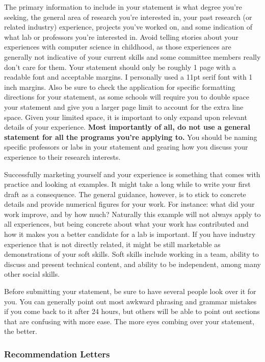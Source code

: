 \documentclass[12pt]{article}
\begin{document}
The primary information to include in your statement is what degree you're seeking, the general area of research you're interested in, your past research (or related industry) experience, projects you've worked on, and some indication of what lab or professors you're interested in. Avoid telling stories about your experiences with computer science in childhood, as those experiences are generally not indicative of your current skills and some committee members really don't care for them. \cite{mightgradguide,vasansop} Your statement should only be roughly 1 page with a readable font and acceptable margins. I personally used a 11pt serif font with 1 inch margins. Also be sure to check the application for specific formatting directions for your statement, as some schools will require you to double space your statement and give you a larger page limit to account for the extra line space. Given your limited space, it is important to only expand upon relevant details of your experience. \textbf{Most importantly of all, do not use a general statement for all the programs you're applying to.} You should be naming specific professors or labs in your statement and gearing how you discuss your experience to their research interests.

Successfully marketing yourself and your experience is something that comes with practice and looking at examples. It might take a long while to write your first draft as a consequence. The general guidance, however, is to stick to concrete details and provide numerical figures for your work. For instance: what did your work improve, and by how much? Naturally this example will not always apply to all experiences, but being concrete about what your work has contributed and how it makes you a better candidate for a lab is important. If you have industry experience that is not directly related, it might be still marketable as demonstrations of your soft skills. Soft skills include working in a team, ability to discuss and present technical content, and ability to be independent, among many other social skills.

Before submitting your statement, be sure to have several people look over it for you. You can generally point out most awkward phrasing and grammar mistakes if you come back to it after 24 hours, but others will be able to point out sections that are confusing with more ease. The more eyes combing over your statement, the better.

\subsubsection{Recommendation Letters}
\end{document}
